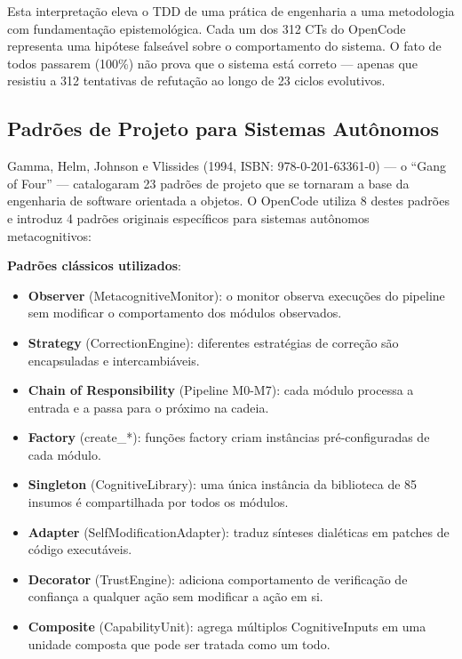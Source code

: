 Esta interpretação eleva o TDD de uma prática de engenharia a uma metodologia com fundamentação epistemológica. Cada um dos 312 CTs do OpenCode representa uma hipótese falseável sobre o comportamento do sistema. O fato de todos passarem (100\%) não prova que o sistema está correto — apenas que resistiu a 312 tentativas de refutação ao longo de 23 ciclos evolutivos.

\subsection{Padrões de Projeto para Sistemas Autônomos}

Gamma, Helm, Johnson e Vlissides (1994, ISBN: 978-0-201-63361-0) — o ``Gang of Four'' — catalogaram 23 padrões de projeto que se tornaram a base da engenharia de software orientada a objetos. O OpenCode utiliza 8 destes padrões e introduz 4 padrões originais específicos para sistemas autônomos metacognitivos:

\textbf{Padrões clássicos utilizados}:
\begin{itemize}
    \item \textbf{Observer} (MetacognitiveMonitor): o monitor observa execuções do pipeline sem modificar o comportamento dos módulos observados.
    \item \textbf{Strategy} (CorrectionEngine): diferentes estratégias de correção são encapsuladas e intercambiáveis.
    \item \textbf{Chain of Responsibility} (Pipeline M0-M7): cada módulo processa a entrada e a passa para o próximo na cadeia.
    \item \textbf{Factory} (create\_*): funções factory criam instâncias pré-configuradas de cada módulo.
    \item \textbf{Singleton} (CognitiveLibrary): uma única instância da biblioteca de 85 insumos é compartilhada por todos os módulos.
    \item \textbf{Adapter} (SelfModificationAdapter): traduz sínteses dialéticas em patches de código executáveis.
    \item \textbf{Decorator} (TrustEngine): adiciona comportamento de verificação de confiança a qualquer ação sem modificar a ação em si.
    \item \textbf{Composite} (CapabilityUnit): agrega múltiplos CognitiveInputs em uma unidade composta que pode ser tratada como um todo.
\end{itemize}

